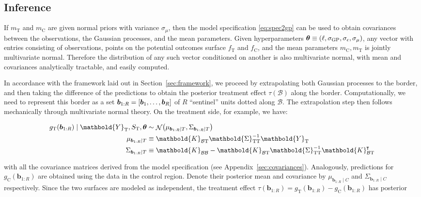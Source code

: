 \documentclass[letter]{article}
\DeclarePairedDelimiter{\parenthesis}{\lparen}{\rparen}
\DeclarePairedDelimiter{\curlybracket}{\lbrack}{\rbrack}
\newcommand{\del}[1]{\parenthesis*{#1}}
\newcommand{\cbr}[1]{\curlybracket*{#1}}
\DeclareMathOperator{\normal}{\mathcal{N}}
\newcommand*{\trans}{^{\mkern-1.5mu\intercal}}
\newcommand{\treat}{\mathrm{T}}
\newcommand{\ctrol}{\mathrm{C}}
\newcommand{\sigmaf}{\sigma_{\mathrm{GP}}}
\newcommand{\sigman}{\sigma_{\epsilon}}
\newcommand{\sigmamu}{\sigma_{\mu}}
\newcommand{\Yvec}{\mathbold{Y}}
\newcommand{\yt}{\Yvec_{\treat}}
\newcommand{\border}{\mathcal{B}}
\newcommand{\sentinel}{\bm{b}}
\newcommand{\numsent}{R}
\newcommand{\sentinels}{\sentinel_{1:\numsent}}
\newcommand{\sentinelset}{\cbr{\sentinel_1,\ldots,\sentinel_\numsent}}
\newcommand{\hyperparam}{\bm{\theta}}
\newcommand{\Kmat}{\mathbold{K}}
\newcommand{\SigmaMat}{\mathbold{\Sigma}}
\newcommand{\KBB}{\Kmat_{\border \border}}
\newcommand{\KBT}{\Kmat_{\border \treat}}
\newcommand{\STT}{\SigmaMat_{\treat \treat}}
\begin{document}
    	\subsection{Inference}\label{inference}

If \(m_\treat\) and \(m_\ctrol\) are given normal priors with variance \(\sigmamu\), then the model specification \eqref{eq:spec2gp} can be used to obtain covariances between the observations, the Gaussian processes, and the mean parameters.
Given hyperparameters \(\hyperparam \equiv \del{\ell,\sigmaf, \sigman, \sigmamu}\), any vector with entries consisting of observations, points on the potential outcomes surface \(f_{\treat}\) and \(f_{\ctrol}\), and the mean parameters \(m_{\ctrol}, m_{\treat}\) is jointly multivariate normal. Therefore the distribution of any such vector conditioned on another is also multivariate normal, with mean and covariances analytically tractable, and easily computed.
    


    	In accordance with the framework laid out in Section~\ref{sec:framework}, we proceed by extrapolating both Gaussian processes to the border,
and then taking the difference of the predictions to obtain the posterior treatment effect \(\tau(\border)\) along the border.
Computationally, we need to represent this border as a set \(\sentinels=\sentinelset\) of \(\numsent\) ``sentinel'' units dotted along \(\border\).
The extrapolation step then follows mechanically through multivariate normal theory.
On the treatment side, for example, we have:

\begin{equation}\begin{split}
    g_\treat{}(\sentinels) \mid \yt{}, S_\treat{}, \hyperparam &\sim \normal\del{\mu_{\sentinels \mid T}, \Sigma_{\sentinels \mid T}} \\
    \mu_{\sentinels \mid T} &\equiv 
            \KBT
            \STT^{-1} 
            \yt{} 
        \\
    \Sigma_{\sentinels \mid T} &\equiv 
            \KBB - \KBT \STT^{-1} \KBT\trans
\end{split}
 \label{eq:postvar2gp_t_or_c}
\end{equation}

with all the covariance matrices derived from the model specification (see Appendix~\ref{sec:covariances}).
Analogously, predictions for \(g_\ctrol{}(\sentinels)\) are obtained using the data in the control region.
Denote their posterior mean and covariance by \(\mu_{\sentinels \mid C}\) and \(\Sigma_{\sentinels \mid C}\) respectively.
Since the two surfaces are modeled as independent, the treatment effect \(\tau(\sentinels)=g_\treat{}(\sentinels)-g_\ctrol{}(\sentinels)\) has posterior
\end{document}
